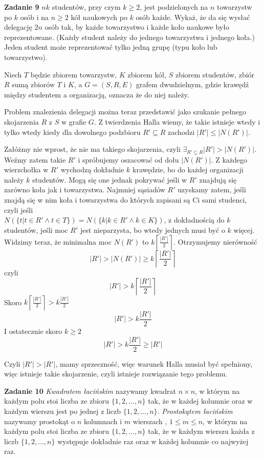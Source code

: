 \documentclass[12pt,a4paper]{article}
\begin{document}
\newpage
\noindent
\textbf{Zadanie 9} \(nk\) studentów, przy czym \(k \geq 2\), jest podzielonych na \(n\) towarzystw po \(k\) osób i na \(n \geq 2\) kół naukowych po \(k\) osób każde. Wykaż, że da się wysłać delegację \(2n\) osób tak, by każde towarzystwo i każde koło naukowe było reprezentowane. (Każdy student należy do jednego towarzystwa i jednego koła.) Jeden student może reprezentować tylko jedną grupę (typu koło lub towarzystwo).
\vskip 0.2cm

Niech \(T\) będzie zbiorem towarzystw, \(K\) zbiorem kół, \(S\) zbiorem studentów, zbiór \(R\) sumą zbiorów \(T\) i \(K\), a \(G=(S, R, E) \) grafem dwudzielnym, gdzie krawędź między studentem a organizacją, oznacza że do niej należy. 

Problem znalezienia delegacji można teraz przedstawić jako szukanie pełnego skojarzenia \(R\) z \(S\) w grafie \(G\). Z twierdzenia Halla wiemy, że takie istnieje wtedy i tylko wtedy kiedy dla dowolnego podzbioru \(R' \subseteq R\) zachodzi \( |R'| \leq |N(R')| \).

Załóżmy nie wprost, że nie ma takiego skojarzenia, czyli \(\exists_{R' \subseteq R} |R'| > |N(R')| \). Weźmy zatem takie \(R'\) i spróbujemy oszacować od dołu \( |N(R')| \). Z każdego wierzchołka w \(R'\) wychodzą dokładnie \(k\) krawędzie, bo do każdej organizacji należy \(k\) studentów. Mogą się one jednak pokrywać jeśli w \(R'\) znajdują się zarówno koła jak i towarzystwa. Najmniej sąsiadów \(R'\) uzyskamy zatem, jeśli znajdą się w nim koła i towarzystwa do których zapisani są Ci sami studenci, czyli jeśli \\ \( N(\{t | t\in R' \wedge t \in T\}) = N(\{k | k\in R' \wedge k \in K\}) \), z dokładnością do \(k\) studentów, jeśli moc \(R'\) jest nieparzysta, bo wtedy jednych musi być o \(k\) więcej. Widzimy teraz, że minimalna moc \(N(R')\) to \( k\left\lceil \frac{|R'|}{2} \right\rceil \). Otrzymujemy nierówność
\[
	|R'| > |N(R')| \geq k\left\lceil \frac{|R'|}{2} \right\rceil
\]
czyli
\[
	|R'| > k\left\lceil \frac{|R'|}{2} \right\rceil
\]
Skoro \( k\left\lceil \frac{|R'|}{2} \right\rceil > k \frac{|R'|}{2} \)
\[
	|R'| > k \frac{|R'|}{2}
\]
I ostatecznie skoro \( k \geq 2 \)
\[
	|R'| > k \frac{|R'|}{2} \geq |R'|
\]

Czyli \( |R'| > |R'| \), mamy sprzeczność, więc warunek Halla musiał być spełniony, więc istnieje takie skojarzenie, czyli istnieje rozwiązanie tego problemu.

\newpage
\noindent
\textbf{Zadanie 10} \textit{Kwadratem łacińskim} nazywamy kwadrat \(n \times n\), w którym na każdym polu stoi liczba ze zbioru \( \{ 1,2,...,n \} \) tak, że w każdej kolumnie oraz w każdym wierszu jest po jednej z liczb \( \{ 1,2,...,n \} \). \textit{Prostokątem łacińskim} nazywamy prostokąt o \(n\) kolumnach i \(m\) wierszach , \( 1 \leq m \leq n \), w którym na każdym polu stoi liczba ze zbioru \( \{ 1,2,...,n \} \) tak, że w każdym wierszu każda z liczb \( \{ 1,2,...,n \} \) występuje dokładnie raz oraz w każdej kolumnie co najwyżej raz.
\end{document}
